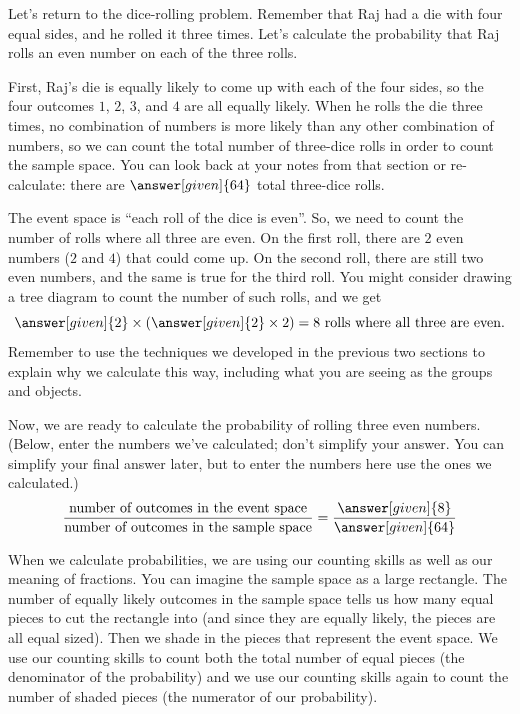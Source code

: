 \documentclass{ximera}
\begin{document}
\begin{example}
Let's return to the dice-rolling problem. Remember that Raj had a die with four equal sides, and he rolled it three times. Let's calculate the probability that Raj rolls an even number on each of the three rolls.

First, Raj's die is equally likely to come up with each of the four sides, so the four outcomes $1$, $2$, $3$, and $4$ are all equally likely. When he rolls the die three times, no combination of numbers is more likely than any other combination of numbers, so we can count the total number of three-dice rolls in order to count the sample space. You can look back at your notes from that section or re-calculate: there are $\answer[given]{64}$ total three-dice rolls.

The event space is ``each roll of the dice is even''. So, we need to count the number of rolls where all three are even. On the first roll, there are $2$ even numbers ($2$ and $4$) that could come up. On the second roll, there are still two even numbers, and the same is true for the third roll. You might consider drawing a tree diagram to count the number of such rolls, and we get
\[
\answer[given]{2} \times \left ( \answer[given]{2} \times 2 \right ) = 8 \textrm{ rolls where all three are even}.
\]
Remember to use the techniques we developed in the previous two sections to explain why we calculate this way, including what you are seeing as the groups and objects.

Now, we are ready to calculate the probability of rolling three even numbers. (Below, enter the numbers we've calculated; don't simplify your answer. You can simplify your final answer later, but to enter the numbers here use the ones we calculated.)
\[
\frac{\textrm{number of outcomes in the event space}}{\textrm{number of outcomes in the sample space}} = \frac{\answer[given]{8}}{\answer[given]{64}}
\]

\end{example}

When we calculate probabilities, we are using our counting skills as well as our meaning of fractions. You can imagine the sample space as a large rectangle. The number of equally likely outcomes in the sample space tells us how many equal pieces to cut the rectangle into (and since they are equally likely, the pieces are all equal sized). Then we shade in the pieces that represent the event space. We use our counting skills to count both the total number of equal pieces (the denominator of the probability) and we use our counting skills again to count the number of shaded pieces (the numerator of our probability).
\end{document}
